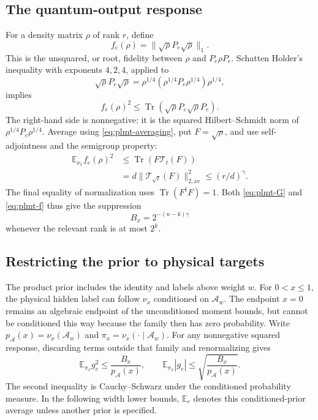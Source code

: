 \documentclass[11pt,a4paper]{article}
\numberwithin{equation}{section}
\theoremstyle{definition}
\theoremstyle{remark}
\begin{document}
\subsection{The quantum-output response}
For a density matrix \(\rho\) of rank \(r\), define
\[
 f_e(\rho)=\|\sqrt\rho P_e\sqrt\rho\|_1.
\]
This is the unsquared, or root, fidelity between \(\rho\) and \(P_e\rho P_e\). Schatten Holder's inequality with exponents \(4,2,4\), applied to
\[
 \sqrt\rho P_e\sqrt\rho
 =\rho^{1/4}(\rho^{1/4}P_e\rho^{1/4})\rho^{1/4},
\]
implies
\[
 f_e(\rho)^2\leq
 \operatorname{Tr}(\sqrt\rho P_e\sqrt\rho P_e).
\]
The right-hand side is nonnegative: it is the squared Hilbert--Schmidt norm of \(\rho^{1/4}P_e\rho^{1/4}\). Average using \eqref{eq:plmt-averaging}, put \(F=\sqrt\rho\), and use self-adjointness and the semigroup property:
\begin{align}
 \mathbb E_{\nu_x}f_e(\rho)^2
 &\leq \operatorname{Tr}(F\mathcal T_t(F))\\
 &=d\|\mathcal T_{\sqrt t}(F)\|_{2,\mathrm{av}}^2
 \leq(r/d)^\gamma.
 \label{eq:plmt-f}
\end{align}
The final equality of normalization uses \(\operatorname{Tr}(F^\dagger F)=1\). Both \eqref{eq:plmt-G} and \eqref{eq:plmt-f} thus give the suppression
\[
 B_x=2^{-(n-k)\gamma}
\]
whenever the relevant rank is at most \(2^k\).

\subsection{Restricting the prior to physical targets}
The product prior includes the identity and labels above weight \(w\). For \(0<x\leq1\), the physical hidden label can follow \(\nu_x\) conditioned on \(\mathcal A_w\). The endpoint \(x=0\) remains an algebraic endpoint of the unconditioned moment bounds, but cannot be conditioned this way because the family then has zero probability. Write \(p_{\mathcal A}(x)=\nu_x(\mathcal A_w)\) and \(\pi_x=\nu_x(\cdot\mid\mathcal A_w)\). For any nonnegative squared response, discarding terms outside that family and renormalizing gives
\begin{equation}
 \mathbb E_{\pi_x}g_e^2
 \leq \frac{B_x}{p_{\mathcal A}(x)},
 \qquad
 \mathbb E_{\pi_x}|g_e|
 \leq\sqrt{\frac{B_x}{p_{\mathcal A}(x)}}.
 \label{eq:plmt-conditioning}
\end{equation}
The second inequality is Cauchy--Schwarz under the conditioned probability measure. In the following width lower bounds, \(\mathbb E_e\) denotes this conditioned-prior average unless another prior is specified.
\end{document}
